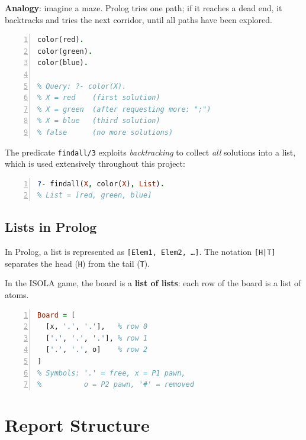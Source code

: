 \textbf{Analogy}: imagine a maze. Prolog tries one path;
if it reaches a dead end, it backtracks and tries the next
corridor, until all paths have been explored.

\begin{lstlisting}[language=Prolog,
    caption={Backtracking demonstration},
    label={lst:backtrack},
    numbers=left,
    basicstyle=\small\ttfamily,
    frame=single]
color(red).
color(green).
color(blue).

% Query: ?- color(X).
% X = red    (first solution)
% X = green  (after requesting more: ";")
% X = blue   (third solution)
% false      (no more solutions)
\end{lstlisting}

The predicate \texttt{findall/3} exploits \textit{backtracking} to
collect \emph{all} solutions into a list, which is used extensively
throughout this project:

\begin{lstlisting}[language=Prolog,
    caption={findall collects all solutions},
    label={lst:findall_intro},
    numbers=left,
    basicstyle=\small\ttfamily,
    frame=single]
?- findall(X, color(X), List).
% List = [red, green, blue]
\end{lstlisting}

\subsection{Lists in Prolog}

In Prolog, a list is represented as
\texttt{[Elem1,\,Elem2,\,\ldots]}. The notation \texttt{[H|T]} separates
the head (\texttt{H}) from the tail (\texttt{T}).

In the ISOLA game, the board is a \textbf{list of lists}: each
row of the board is a list of atoms.

\begin{lstlisting}[language=Prolog,
    caption={3{\texttimes}3 board as a list of lists},
    label={lst:board_list},
    numbers=left,
    basicstyle=\small\ttfamily,
    frame=single]
Board = [
  [x, '.', '.'],   % row 0
  ['.', '.', '.'], % row 1
  ['.', '.', o]    % row 2
]
% Symbols: '.' = free, x = P1 pawn,
%          o = P2 pawn, '#' = removed
\end{lstlisting}


\section{Report Structure}
\label{sec:structure}

